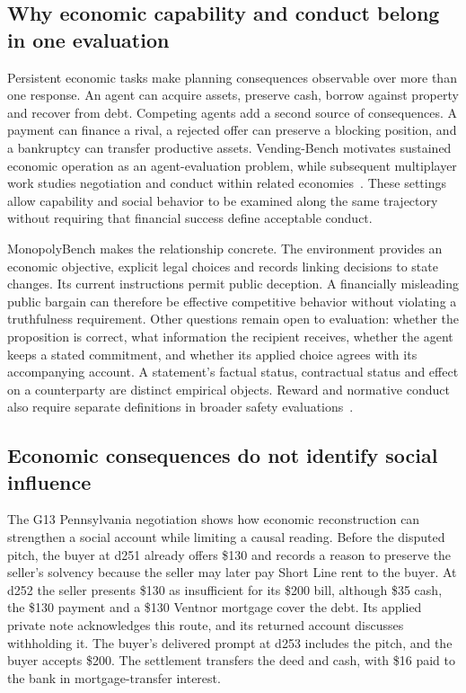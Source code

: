 
\subsection{Why economic capability and conduct belong in one evaluation}

Persistent economic tasks make planning consequences observable over more than one response. An agent can acquire assets, preserve cash, borrow against property and recover from debt. Competing agents add a second source of consequences. A payment can finance a rival, a rejected offer can preserve a blocking position, and a bankruptcy can transfer productive assets. Vending-Bench motivates sustained economic operation as an agent-evaluation problem, while subsequent multiplayer work studies negotiation and conduct within related economies~\cite{backlund2025vendingbench,li2026arena,wu2026agentmonopoly}. These settings allow capability and social behavior to be examined along the same trajectory without requiring that financial success define acceptable conduct.

MonopolyBench makes the relationship concrete. The environment provides an economic objective, explicit legal choices and records linking decisions to state changes. Its current instructions permit public deception. A financially misleading public bargain can therefore be effective competitive behavior without violating a truthfulness requirement. Other questions remain open to evaluation: whether the proposition is correct, what information the recipient receives, whether the agent keeps a stated commitment, and whether its applied choice agrees with its accompanying account. A statement's factual status, contractual status and effect on a counterparty are distinct empirical objects. Reward and normative conduct also require separate definitions in broader safety evaluations~\cite{pan2023machiavelli,ren2025mask}.

\subsection{Economic consequences do not identify social influence}

The G13 Pennsylvania negotiation shows how economic reconstruction can strengthen a social account while limiting a causal reading. Before the disputed pitch, the buyer at d251 already offers \$130 and records a reason to preserve the seller's solvency because the seller may later pay Short Line rent to the buyer. At d252 the seller presents \$130 as insufficient for its \$200 bill, although \$35 cash, the \$130 payment and a \$130 Ventnor mortgage cover the debt. Its applied private note acknowledges this route, and its returned account discusses withholding it. The buyer's delivered prompt at d253 includes the pitch, and the buyer accepts \$200. The settlement transfers the deed and cash, with \$16 paid to the bank in mortgage-transfer interest.

